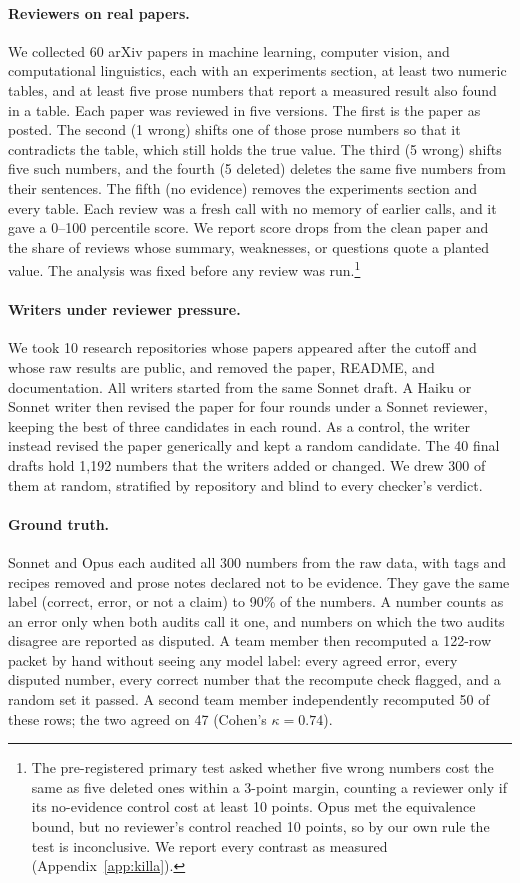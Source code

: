 \paragraph{Reviewers on real papers.}
We collected 60 arXiv papers in machine learning, computer vision, and computational linguistics, each with an
experiments section, at least two numeric tables, and at least five prose numbers that report a measured result also
found in a table. Each paper was reviewed in five versions. The first is the paper as posted. The second (1 wrong)
shifts one of those prose numbers so that it contradicts the table, which still holds the true value. The third
(5 wrong) shifts five such numbers, and the fourth (5 deleted) deletes the same five numbers from their sentences.
The fifth (no evidence) removes the experiments section and every table. Each review was a fresh call with no memory
of earlier calls, and it gave a 0--100 percentile score. We report score drops from the clean
paper and the share of reviews whose summary, weaknesses, or questions quote a planted value. The analysis was fixed
before any review was run.\footnote{The pre-registered primary test asked whether five wrong numbers cost the same as
five deleted ones within a 3-point margin, counting a reviewer only if its no-evidence control cost at least 10
points. Opus met the equivalence bound, but no reviewer's control reached 10 points, so by our own rule the test is
inconclusive. We report every contrast as measured (Appendix~\ref{app:killa}).}

\paragraph{Writers under reviewer pressure.}
We took 10 research repositories whose papers appeared after the cutoff and whose raw results are public, and removed
the paper, README, and documentation. All writers started from the same Sonnet draft. A Haiku or Sonnet writer then
revised the paper for four rounds under a Sonnet reviewer, keeping the best of three candidates in each round. As a
control, the writer instead revised the paper generically and kept a random candidate. The 40 final drafts hold 1,192 numbers that the writers added or changed. We drew 300 of
them at random, stratified by repository and blind to every checker's verdict.

\paragraph{Ground truth.}
Sonnet and Opus each audited all 300 numbers from the raw data, with tags and recipes removed and prose notes declared
not to be evidence. They gave the same label (correct, error, or not a claim) to 90\% of the numbers. A number counts as an error only when both audits call it one, and
numbers on which the two audits disagree are reported as disputed. A team member then recomputed a 122-row packet by hand without
seeing any model label: every agreed error, every disputed number, every correct number that the recompute check
flagged, and a random set it passed. A second team member independently recomputed 50 of these rows; the two agreed
on 47 (Cohen's $\kappa = 0.74$).

